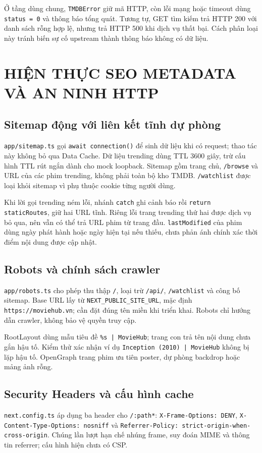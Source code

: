 \documentclass[12pt,a4paper]{extarticle}
\begin{document}
Ở tầng dùng chung, \texttt{TMDBError} giữ mã HTTP, còn lỗi mạng hoặc timeout dùng \texttt{status = 0} và thông báo tổng quát. Tương tự, GET tìm kiếm trả HTTP 200 với danh sách rỗng hợp lệ, nhưng trả HTTP 500 khi dịch vụ thất bại. Cách phân loại này tránh biến sự cố upstream thành thông báo không có dữ liệu.

\clearpage
\section{HIỆN THỰC SEO METADATA VÀ AN NINH HTTP}
\subsection{Sitemap động với liên kết tĩnh dự phòng}
\nolinkurl{app/sitemap.ts} gọi \texttt{await connection()} để sinh dữ liệu khi có request; thao tác này không bỏ qua Data Cache. Dữ liệu trending dùng TTL 3600 giây, trừ cấu hình TTL rút ngắn dành cho mock loopback. Sitemap gồm trang chủ, \texttt{/browse} và URL của các phim trending, không phải toàn bộ kho TMDB. \texttt{/watchlist} được loại khỏi sitemap vì phụ thuộc cookie từng người dùng.

Khi lời gọi trending ném lỗi, nhánh \texttt{catch} ghi cảnh báo rồi \texttt{return staticRoutes}, giữ hai URL tĩnh. Riêng lỗi trang trending thứ hai được dịch vụ bỏ qua, nên vẫn có thể trả URL phim từ trang đầu. \texttt{lastModified} của phim dùng ngày phát hành hoặc ngày hiện tại nếu thiếu, chưa phản ánh chính xác thời điểm nội dung được cập nhật.

\subsection{Robots và chính sách crawler}
\nolinkurl{app/robots.ts} cho phép thu thập \texttt{/}, loại trừ \texttt{/api/}, \texttt{/watchlist} và công bố sitemap. Base URL lấy từ \nolinkurl{NEXT_PUBLIC_SITE_URL}, mặc định \texttt{https://moviehub.vn}; cần đặt đúng tên miền khi triển khai. Robots chỉ hướng dẫn crawler, không bảo vệ quyền truy cập.

RootLayout dùng mẫu tiêu đề \texttt{\%s | MovieHub}; trang con trả tên nội dung chưa gắn hậu tố. Kiểm thử xác nhận ví dụ \texttt{Inception (2010) | MovieHub} không bị lặp hậu tố. OpenGraph trang phim ưu tiên poster, dự phòng backdrop hoặc mảng ảnh rỗng.

\subsection{Security Headers và cấu hình cache}
\nolinkurl{next.config.ts} áp dụng ba header cho \texttt{/:path*}: \nolinkurl{X-Frame-Options: DENY}, \nolinkurl{X-Content-Type-Options: nosniff} và \nolinkurl{Referrer-Policy: strict-origin-when-cross-origin}. Chúng lần lượt hạn chế nhúng frame, suy đoán MIME và thông tin referrer; cấu hình hiện chưa có CSP.
\end{document}

